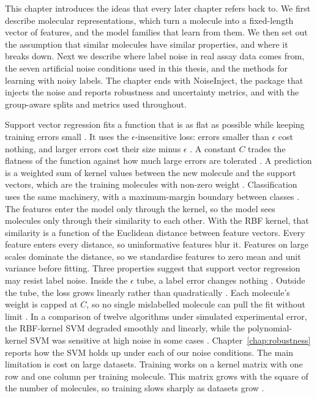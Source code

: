 This chapter introduces the ideas that every later chapter refers back to. We first describe molecular representations, which turn a molecule into a fixed-length vector of features, and the model families that learn from them. We then set out the assumption that similar molecules have similar properties, and where it breaks down. Next we describe where label noise in real assay data comes from, the seven artificial noise conditions used in this thesis, and the methods for learning with noisy labels. The chapter ends with NoiseInject, the package that injects the noise and reports robustness and uncertainty metrics, and with the group-aware splits and metrics used throughout.

Support vector regression fits a function that is as flat as possible while keeping training errors small \citep{Vapnik1995, Smola2004}. It uses the $\epsilon$-insensitive loss: errors smaller than $\epsilon$ cost nothing, and larger errors cost their size minus $\epsilon$ \citep{Smola2004}. A constant $C$ trades the flatness of the function against how much large errors are tolerated \citep{Smola2004}. A prediction is a weighted sum of kernel values between the new molecule and the support vectors, which are the training molecules with non-zero weight \citep{Smola2004}. Classification uses the same machinery, with a maximum-margin boundary between classes \citep{Cortes1995}.
The features enter the model only through the kernel, so the model sees molecules only through their similarity to each other. With the RBF kernel, that similarity is a function of the Euclidean distance between feature vectors. Every feature enters every distance, so uninformative features blur it. Features on large scales dominate the distance, so we standardise features to zero mean and unit variance before fitting.
Three properties suggest that support vector regression may resist label noise. Inside the $\epsilon$ tube, a label error changes nothing \citep{Smola2004}. Outside the tube, the loss grows linearly rather than quadratically \citep{Smola2004}. Each molecule's weight is capped at $C$, so no single mislabelled molecule can pull the fit without limit \citep{Smola2004}. In a comparison of twelve algorithms under simulated experimental error, the RBF-kernel SVM degraded smoothly and linearly, while the polynomial-kernel SVM was sensitive at high noise in some cases \citep{Cortes2015}. Chapter~\ref{chap:robustness} reports how the SVM holds up under each of our noise conditions.
The main limitation is cost on large datasets. Training works on a kernel matrix with one row and one column per training molecule. This matrix grows with the square of the number of molecules, so training slows sharply as datasets grow \citep{Chang2011}.

